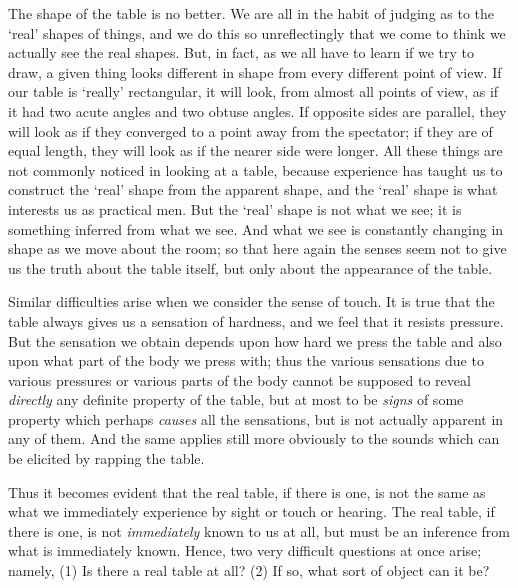 \documentclass[oneside,letterpaper,12pt]{book}
\begin{document}
The shape of the table is no better. We are all in the habit of judging
as to the `real' shapes of things, and
we do this so unreflectingly that we come to think we actually see the
real shapes. But, in fact, as we all have to learn if we try to draw, a
given thing looks different in shape from every different point of view.
If our table is `really' rectangular,
it will look, from almost all points of view, as if it had two acute
angles and two obtuse angles. If opposite sides are parallel, they will
look as if they converged to a point away from the spectator; if they
are of equal length, they will look as if the nearer side were longer.
All these things are not commonly noticed in looking at a table, because
experience has taught us to construct the
`real' shape from the apparent shape,
and the `real' shape is what interests
us as practical men. But the `real'
shape is not what we see; it is something inferred from what we see. And
what we see is constantly changing in shape as we move about the room;
so that here again the senses seem not to give us the truth about the
table itself, but only about the appearance of the table.

Similar difficulties arise when we consider the sense of touch. It is
true that the table always gives us a sensation of hardness, and we feel
that it resists pressure. But the sensation we obtain depends upon how
hard we press the table and also upon what part of the body we press
with; thus the various sensations due to various pressures or various
parts of the body cannot be supposed to reveal \emph{directly} any
definite property of the table, but at most to be \emph{signs} of some
property which perhaps \emph{causes} all the sensations, but is not
actually apparent in any of them. And the same applies still more
obviously to the sounds which can be elicited by rapping the table.

Thus it becomes evident that the real table, if there is one, is not the
same as what we immediately experience by sight or touch or hearing. The
real table, if there is one, is not \emph{immediately} known to us at
all, but must be an inference from what is immediately known. Hence, two
very difficult questions at once arise; namely, (1) Is there a real
table at all? (2) If so, what sort of object can it be?
\end{document}
